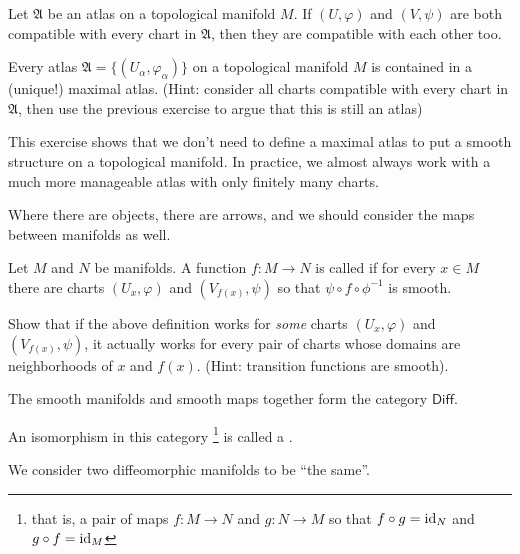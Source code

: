 \documentclass[../main.tex]{subfiles}
\begin{document}
\begin{ExerciseList}

\Exercise[label={ex:automatic-compatibility-of-charts}]
Let $\mathfrak{A}$ be an atlas on a topological manifold $M$. 
If $(U, \varphi)$ and $(V, \psi)$ are both compatible with every
chart in $\mathfrak{A}$, then they are compatible with each other too.

\Exercise[label={ex:atlases-extend-to-maximal-atlases}]
Every atlas $\mathfrak{A} = \{ (U_\alpha, \varphi_\alpha) \}$ on a 
topological manifold $M$ is contained in a (unique!) maximal atlas.
(Hint: consider all charts compatible with every chart in $\mathfrak{A}$,
then use the previous exercise to argue that this is still an atlas)

This exercise shows that we don't need to define a maximal atlas to put a 
smooth structure on a topological manifold. In practice, we almost always 
work with a much more manageable atlas with only finitely many charts.
  
\end{ExerciseList}

\bigskip

Where there are objects, there are arrows, and we should consider the 
maps between manifolds as well. 

\begin{defn}
  Let $M$ and $N$ be manifolds. A function $f : M \to N$ is called 
   if for every $x \in M$ there are charts
  $(U_x, \varphi)$ and $(V_{f(x)}, \psi)$ so that 
  $\psi \circ f \circ \phi^{-1}$ is smooth.
\end{defn}

\begin{ExerciseList}
  
\Exercise[label={ex:any-chart-works-for-smooth-map}]
Show that if the above definition works for \emph{some} charts
$(U_x, \varphi)$ and $(V_{f(x)}, \psi)$, it actually works for 
every pair of charts whose domains are neighborhoods of $x$ and $f(x)$.
(Hint: transition functions are smooth).

\end{ExerciseList}


\begin{defn}
  The smooth manifolds and smooth maps together form the category $\mathsf{Diff}$.

  An isomorphism in this category%
  \footnote{that is, a pair of maps $f : M \to N$ and $g : N \to M$ so that 
  $f \circ g = \mathrm{id}_N$ and $g \circ f = \mathrm{id}_M$} is called a .

  We consider two diffeomorphic manifolds to be ``the same''.
\end{defn}
\end{document}
